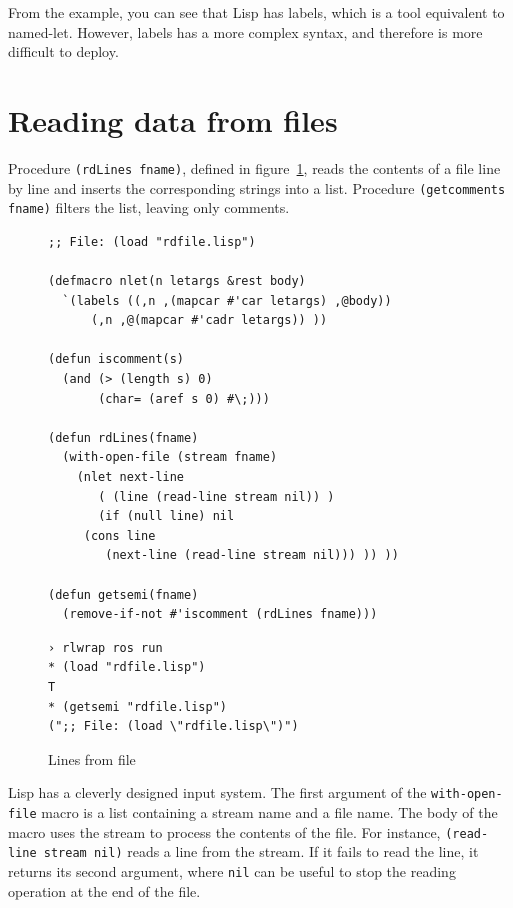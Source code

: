 \documentclass[a4paper,12pt]{book}
\newenvironment{fmpage}[1]
           {\begin{lrbox}{\fmbox}\begin{minipage}{#1}}
           {\end{minipage}\end{lrbox}\fbox{\usebox{\fmbox}}}
\begin{document}
From the example, you can see that Lisp has labels,
which is a tool equivalent to named-let. However,
labels has a more complex syntax, and therefore is
more difficult to deploy.

\section{Reading data from files}

Procedure \verb|(rdLines fname)|, defined in
figure~\ref{rdFile}, reads the contents of a file
line by line and inserts the corresponding strings
into a list. Procedure \verb|(getcomments fname)|
filters the list, leaving only comments.
\begin{figure}[!h]
\begin{fmpage}{\linewidth}
\begin{verbatim}
;; File: (load "rdfile.lisp")

(defmacro nlet(n letargs &rest body)
  `(labels ((,n ,(mapcar #'car letargs) ,@body))
      (,n ,@(mapcar #'cadr letargs)) ))

(defun iscomment(s)
  (and (> (length s) 0)
       (char= (aref s 0) #\;)))

(defun rdLines(fname)
  (with-open-file (stream fname)
    (nlet next-line 
       ( (line (read-line stream nil)) )
       (if (null line) nil
	 (cons line
	    (next-line (read-line stream nil))) )) ))

(defun getsemi(fname)
  (remove-if-not #'iscomment (rdLines fname)))
\end{verbatim}
\end{fmpage}

\begin{fmpage}{\linewidth}
\begin{verbatim}
› rlwrap ros run
* (load "rdfile.lisp")
T
* (getsemi "rdfile.lisp")
(";; File: (load \"rdfile.lisp\")")
\end{verbatim}
\end{fmpage}
\caption{Lines from file}
\label{rdFile}
\end{figure}

Lisp has a cleverly designed input system.
The first argument of the 
 \verb|with-open-file|
\label{page:with-open-file} macro is a list
containing a stream name and a file name. The
body of the macro uses the stream to process the
contents of the file. For instance,
\verb|(read-line stream nil)| reads a line from
the stream. If it fails to read the line, it
returns its second argument, where \verb|nil|
can be useful to stop the reading operation
at the end of the file.
\end{document}
